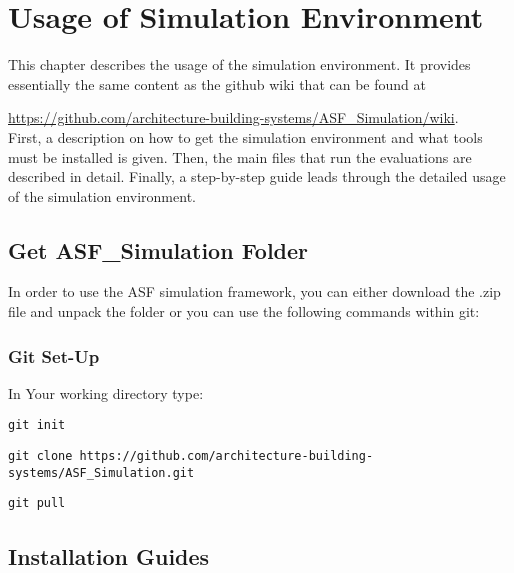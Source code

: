 
\chapter{Usage of Simulation Environment}\label{usage}

This chapter describes the usage of the simulation environment. It provides essentially the same content as the github wiki that can be found at 

\url{https://github.com/architecture-building-systems/ASF_Simulation/wiki}.\\

First, a description on how to get the simulation environment and what tools must be installed is given. Then, the main files that run the evaluations are described in detail. Finally, a step-by-step guide leads through the detailed usage of the simulation environment. 

\section{Get ASF\_Simulation Folder}
\label{s:getFolder}
	
	In order to use the ASF simulation framework, you can either download the .zip file and unpack the folder or you can use the following commands within git:

	\subsection{Git Set-Up}

	In Your working directory type:

	\begin{verbatim}git init\end{verbatim}


	\begin{verbatim}git clone https://github.com/architecture-building-systems/ASF_Simulation.git\end{verbatim}


	\begin{verbatim}git pull\end{verbatim}
	
		
\section{Installation Guides}
\label{s:installation}

